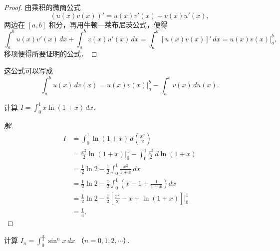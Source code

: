 \begin{proof}
由乘积的微商公式
\[
(u(x)v(x))' = u(x)v'(x) + v(x)u'(x),
\]
两边在 $[a,b]$ 积分，再用牛顿---莱布尼茨公式，便得
\[
\int_a^b u(x)v'(x)\,dx + \int_a^b v(x)u'(x)\,dx = \int_a^b [u(x)v(x)]'\,dx = u(x)v(x)\bigg|_a^b,
\]
移项便得所要证明的公式．
\end{proof}

这公式可以写成
\[
\int_a^b u(x)\,dv(x) = u(x)v(x)\bigg|_a^b - \int_a^b v(x)\,du(x).
\]

\begin{example}
计算 $\displaystyle I = \int_0^1 x\ln(1 + x)\,dx$．
\end{example}

\begin{proof}[解]
\begin{align*}
I &= \int_0^1 \ln(1 + x)\,d\left(\frac{x^2}{2}\right) \\
&= \frac{x^2}{2}\ln(1 + x)\bigg|_0^1 - \int_0^1 \frac{x^2}{2}\,d\ln(1 + x) \\
&= \frac{1}{2}\ln 2 - \frac{1}{2}\int_0^1 \frac{x^2}{1 + x}\,dx \\
&= \frac{1}{2}\ln 2 - \frac{1}{2}\int_0^1 \left(x - 1 + \frac{1}{1 + x}\right)dx \\
&= \frac{1}{2}\ln 2 - \frac{1}{2}\left[\frac{x^2}{2} - x + \ln(1 + x)\right]\Bigg|_0^1 \\
&= \frac{1}{4}.
\end{align*}
\end{proof}

\begin{example}
计算 $\displaystyle I_n = \int_0^{\frac{\pi}{2}}\sin^n x\,dx$ （$n = 0, 1, 2, \cdots$）．
\end{example}

